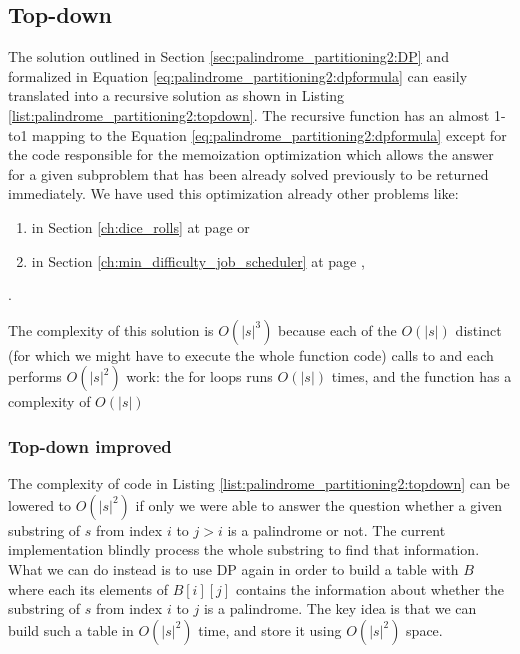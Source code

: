 \subsection{Top-down}
The solution outlined in Section \ref{sec:palindrome_partitioning2:DP} and formalized in Equation
\ref{eq:palindrome_partitioning2:dpformula} can easily translated into a recursive solution as shown
in Listing \ref{list:palindrome_partitioning2:topdown}. The recursive function
 has an almost 1-to1 mapping to the Equation
\ref{eq:palindrome_partitioning2:dpformula} except for the code responsible for the memoization
optimization which allows the answer for a given subproblem that has been already solved previously
to be returned immediately. We have used this optimization already other problems like: 
\begin{enumerate}
	\item  {} in Section \ref{ch:dice_rolls} at page \pageref{ch:dice_rolls} or
	\item {} in Section \ref{ch:min_difficulty_job_scheduler}
at page \pageref{ch:min_difficulty_job_scheduler}, \end{enumerate}.


The complexity of this solution is $O(|s|^3)$ because each of the  $O(|s|)$ distinct (for which we
might have to execute the whole function code) calls to 
and each performs $O(|s|^2)$ work: the for loops runs $O(|s|)$ times, and the function
 has a complexity of $O(|s|)$

\subsubsection{Top-down improved}
The complexity of code in Listing \ref{list:palindrome_partitioning2:topdown} can be lowered to
$O(|s|^2)$ if only we were able to answer the question whether a given substring of $s$ from index
$i$ to $j>i$ is a palindrome or not. The current implementation blindly process the whole substring
to find that information. What we can do instead is to use DP again in order to build a table with
$B$ where each its elements of $B[i][j]$ contains the information about whether the substring of $s$
from index $i$ to $j$ is a palindrome. The key idea is that we can build such a table in $O(|s|^2)$
time, and store it using $O(|s|^2)$ space. 

